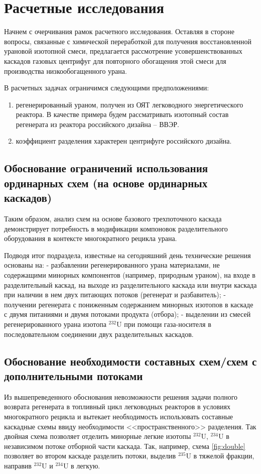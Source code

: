 \chapter{Расчетные исследования}\label{ch:ch2}

Начнем с очерчивания рамок расчетного исследования.
Оставляя в стороне вопросы, связанные с химической переработкой для получения восстановленной урановой изотопной смеси, предлагается рассмотрение усовершенствованных каскадов газовых центрифуг для повторного обогащения этой смеси для производства низкообогащенного урана. 

В расчетных задачах ограничимся следующими предположениями:

 \begin{enumerate}
  \item регенерированный ураном, получен из ОЯТ легководного энергетического реактора. В качестве примера будем рассматривать изотопный состав регенерата из реактора российского дизайна -- ВВЭР.
  \item коэффициент разделения характерен центрифуге российского дизайна.
\end{enumerate}

\section{Обоснование ограничений использования ординарных схем (на основе ординарных каскадов)}\label{sec:ch2/sec1}



Таким образом, анализ схем на основе базового трехпоточного каскада демонстрирует потребность в модификации компоновок разделительного оборудования в контексте многократного рецикла урана.

Подводя итог подраздела, известные на сегодняшний день  технические решения основаны на:
-	разбавлении регенерированного урана материалами, не содержащими минорных компонентов (например, природным ураном), на входе в разделительный каскад, на выходе из разделительного каскада или внутри каскада при наличии в нем двух питающих потоков (регенерат и разбавитель);
-	получении регенерата с пониженным содержанием минорных изотопов в каскаде с двумя питаниями и двумя потоками продукта (отбора);
-	выделении из смесей регенерированного урана изотопа $^{232}$U при помощи газа-носителя в последовательном соединении двух разделительных каскадов.

\section{Обоснование необходимости составных схем/схем с дополнительными потоками}\label{sec:ch2/sec2}
Из вышепреведенного обоснования невозможности решения задачи полного возврата регенерата в топливный цикл легководных реакторов в условиях многократного рецикла и вытекает необходимость использовать составные каскадные схемы ввиду необходимости  <<пространственного>> разделения. Так двойная схема позволяет отделить минорные легкие изотопы $^{232}$U, $^{234}$U в независимом потоке отборной части каскада.
Так, например, схема \ref{fig:double} позволяет во втором каскаде разделить потоки, выделив $^{235}$U в тяжелой фракции, направив $^{232}$U и $^{234}$U в легкую.


